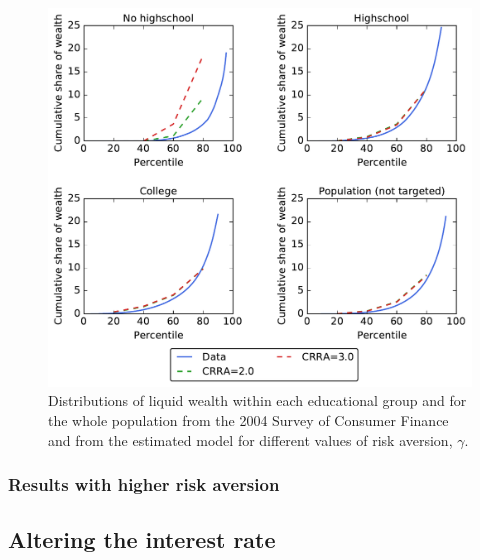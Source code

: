 \documentclass[../HAFiscal]{subfiles}
\begin{document}
\begin{figure}[th]
\begin{center}
	\includegraphics[width=.9\textwidth]{../Figures/LorenzPoints_robustness.pdf}
	\caption{Distributions of liquid wealth within each educational group and for the whole population from the 2004 Survey of Consumer Finance and from the estimated model for different values of risk aversion, $\gamma$.}
	\label{fig:LorenzPts_robustness}
\end{center}
\end{figure}

\subsubsection{Results with higher risk aversion}
\label{sec:robust_gamma_results}


\subsection{Altering the interest rate}
\label{sec:robust_R} 
\end{document}
